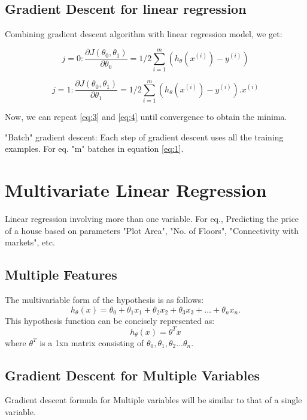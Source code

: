   \subsection{Gradient Descent for linear regression}
    Combining gradient descent algorithm with linear regression model, we get:

    \begin{equation} \label {eq:3}
      j = 0 : \frac{\partial {J(\theta_0, \theta_1)}}{\partial \theta_0} = 1/2 \sum_{i=1}^{m} (h_\theta(x^{(i)})-y^{(i)}) 
    \end{equation}

    \begin{equation} \label {eq:4}
      j = 1 : \frac{\partial {J(\theta_0, \theta_1)}}{\partial \theta_1} = 1/2 \sum_{i=1}^{m} (h_\theta(x^{(i)})-y^{(i)}).x^{(i)}
    \end{equation}

    Now, we can repeat \ref{eq:3} and \ref{eq:4} until convergence to obtain the minima.

    "Batch" gradient descent: Each step of gradient descent uses all the training examples.
    For eq. "m" batches in equation \ref{eq:1}.

\section{Multivariate Linear Regression}
  Linear regression involving more than one variable. For eq., Predicting the price of a house based on parameters "Plot Area", "No. of Floors", "Connectivity with markets", etc.

  \subsection{Multiple Features}
    The multivariable form of the hypothesis is as follows:
    \begin{equation} \label {eq:5}
      h_\theta(x) = \theta_0 + \theta_1x_1 + \theta_2x_2 + \theta_ 3x_3 + ... + \theta_{n}x_n.  
    \end{equation}
    This hypothesis function can be concisely represented as:
    \begin{equation}
      h_\theta(x) = \theta^{T}x
    \end{equation}
    where $ \theta^T $ is a 1xn matrix consisting of $ \theta_0, \theta_1, \theta_2 ... \theta_n $.


  \subsection{Gradient Descent for Multiple Variables}
    Gradient descent formula for Multiple variables will be similar to that of a single variable.

